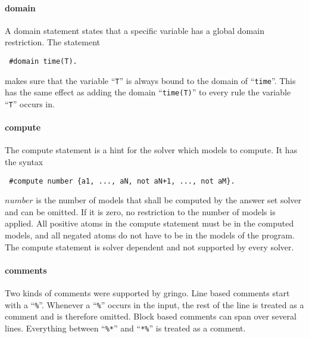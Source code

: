 \documentclass[a4paper,10pt]{article}
\begin{document}
\paragraph{domain}
A domain statement states that a specific variable has a global domain restriction.
The statement
\begin{verbatim}
 #domain time(T).
\end{verbatim}
makes sure that the variable ``\texttt{T}'' is always bound to the domain of ``\texttt{time}''.
This has the same effect as adding the domain ``\texttt{time(T)}'' to every rule the variable ``\texttt{T}'' occurs in.
\paragraph{compute}
The compute statement is a hint for the solver which models to compute.
It has the syntax
\begin{verbatim}
 #compute number {a1, ..., aN, not aN+1, ..., not aM}.
\end{verbatim}
$number$ is the number of models that shall be computed by the answer set solver and can be omitted. If it is zero, no restriction to the number of models is applied.
All positive atoms in the compute statement must be in the computed models, and all negated atoms do not have to be in the models of the program.
The compute statement is solver dependent and not supported by every solver.
\paragraph{comments}
Two kinds of comments were supported by gringo.
Line based comments start with a ``\texttt{\%}''.
Whenever a ``\texttt{\%}'' occurs in the input, the rest of the line is treated as a comment and is therefore omitted.
Block based comments can span over several lines.
Everything between ``\texttt{\%*}'' and ``\texttt{*\%}'' is treated as a comment.
\end{document}
